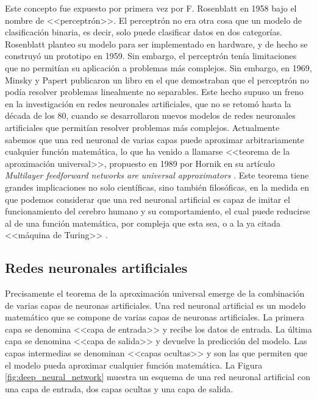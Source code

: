 Este concepto fue expuesto por primera vez por F. Rosenblatt en 1958 \citep{rothmanTransformersNaturalLanguage2021} bajo el nombre de <<perceptrón>>. El perceptrón no era otra cosa que un modelo de clasificación binaria, es decir, solo puede clasificar datos en dos categorías. Rosenblatt planteo su modelo para ser implementado en hardware, y de hecho se construyó un prototipo en 1959. Sin embargo, el perceptrón tenía limitaciones que no permitían su aplicación a problemas más complejos. Sin embargo, en 1969, Minsky y Papert publicaron un libro \citep{minsky1969perceptrons} en el que demostraban que el perceptrón no podía resolver problemas linealmente no separables. Este hecho supuso un freno en la investigación en redes neuronales artificiales, que no se retomó hasta la década de los 80, cuando se desarrollaron nuevos modelos de redes neuronales artificiales que permitían resolver problemas más complejos. Actualmente sabemos que una red neuronal de varias capas puede aproximar arbitrariamente cualquier función matemática, lo que ha venido a llamarse <<teorema de la aproximación universal>>, propuesto en 1989 por Hornik en su artículo \textit{Multilayer feedforward networks are universal approximators} \cite{hornikMultilayerFeedforwardNetworks1989}. Este teorema tiene grandes implicaciones no solo científicas, sino también filosóficas, en la medida en que podemos considerar que una red neuronal artificial es capaz de imitar el funcionamiento del cerebro humano y su comportamiento, el cual puede reducirse al de una función matemática, por compleja que esta sea, o a la ya citada <<máquina de Turing>> \citep{penroseNuevaMenteEmperador2015}.


\subsection{Redes neuronales artificiales}
Precisamente el teorema de la aproximación universal emerge de la combinación de varias capas de neuronas artificiales. Una red neuronal artificial es un modelo matemático que se compone de varias capas de neuronas artificiales. La primera capa se denomina <<capa de entrada>> y recibe los datos de entrada. La última capa se denomina <<capa de salida>> y devuelve la predicción del modelo. Las capas intermedias se denominan <<capas ocultas>> y son las que permiten que el modelo pueda aproximar cualquier función matemática. La Figura \ref{fig:deep_neural_network} muestra un esquema de una red neuronal artificial con una capa de entrada, dos capas ocultas y una capa de salida.

